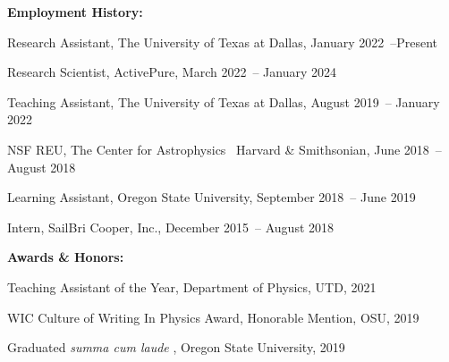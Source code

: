 \documentclass[doublespacing]{utdthesis}
\begin{document}
\begin{vita}
  \bigskip

  {\large\bfseries Employment History:\par}
  \medskip
  Research Assistant, The University of Texas at Dallas, January
  2022~--Present \par
  Research Scientist, ActivePure, March 2022~-- January 2024 \par
  Teaching Assistant, The University of Texas at Dallas, August 2019~-- January
  2022 \par
  NSF REU, The Center for Astrophysics \textbar~Harvard \&
  Smithsonian, June 2018~-- August 2018 \par
  Learning Assistant, Oregon State University, September 2018~-- June 2019 \par
  Intern, SailBri Cooper, Inc., December 2015~-- August 2018 \par

  \bigskip

  {\large\bfseries Awards \& Honors:\par}
  \medskip
  Teaching Assistant of the Year, Department of Physics, UTD, 2021 \par
  WIC Culture of Writing In Physics Award, Honorable Mention, OSU, 2019 \par
  Graduated \textit{summa cum laude} , Oregon State University, 2019\par




\end{vita}  %
\end{document}
